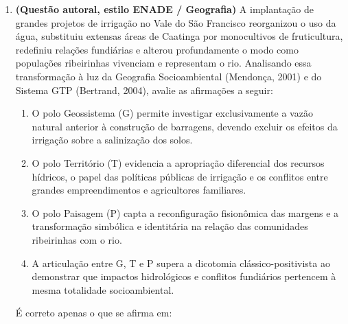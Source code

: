\begin{enumerate}[leftmargin=1.8em, itemsep=5pt, start=16]
  \item \textbf{(Questão autoral, estilo ENADE / Geografia)} A implantação de grandes projetos de irrigação no Vale do São Francisco reorganizou o uso da água, substituiu extensas áreas de Caatinga por monocultivos de fruticultura, redefiniu relações fundiárias e alterou profundamente o modo como populações ribeirinhas vivenciam e representam o rio. Analisando essa transformação à luz da Geografia Socioambiental (Mendonça, 2001) e do Sistema GTP (Bertrand, 2004), avalie as afirmações a seguir:
  \begin{enumerate}[label=\Roman*., leftmargin=2.0em, itemsep=2pt]
    \item O polo Geossistema (G) permite investigar exclusivamente a vazão natural anterior à construção de barragens, devendo excluir os efeitos da irrigação sobre a salinização dos solos.
    \item O polo Território (T) evidencia a apropriação diferencial dos recursos hídricos, o papel das políticas públicas de irrigação e os conflitos entre grandes empreendimentos e agricultores familiares.
    \item O polo Paisagem (P) capta a reconfiguração fisionômica das margens e a transformação simbólica e identitária na relação das comunidades ribeirinhas com o rio.
    \item A articulação entre G, T e P supera a dicotomia clássico-positivista ao demonstrar que impactos hidrológicos e conflitos fundiários pertencem à mesma totalidade socioambiental.
  \end{enumerate}
  É correto apenas o que se afirma em:
  \espacoResolucao[1.3cm]


\end{enumerate}
